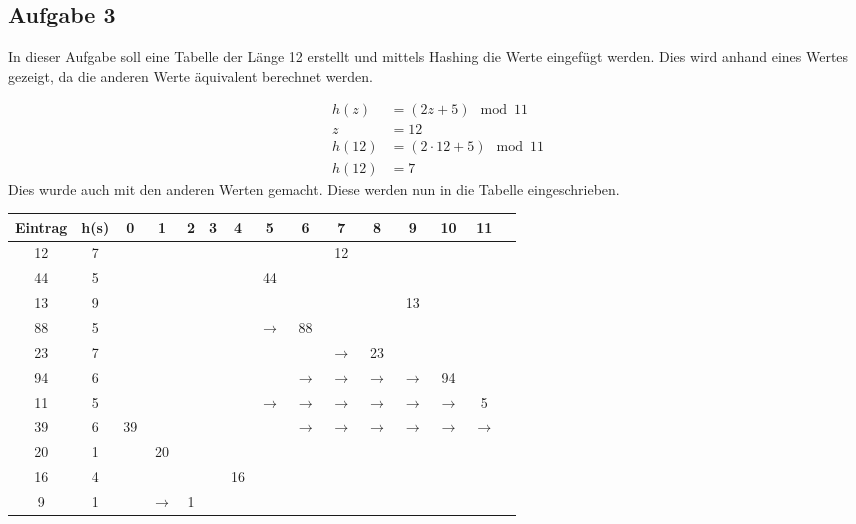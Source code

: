 \documentclass[11pt]{article}
\begin{document}
\newpage

\subsection*{Aufgabe 3}
In dieser Aufgabe soll eine Tabelle der Länge 12 erstellt und mittels Hashing
die Werte eingefügt werden. Dies wird anhand eines Wertes gezeigt, da die 
anderen Werte äquivalent berechnet werden.

\begin{align*}
	h(z) &= (2z+5) \mod 11\\
	z &= 12\\
	h(12) &= (2 \cdot 12 + 5) \mod 11\\
	h(12) &= 7 
\end{align*}
Dies wurde auch mit den anderen Werten gemacht. Diese werden nun in die Tabelle eingeschrieben.
\begin{table}[h!]
	\centering
	\begin{tabular}{|c|c|c|c|c|c|c|c|c|c|c|c|c|c|c|}
		\hline\hline
		\textbf{Eintrag}&\textbf{h(s)} & 0 & 1 & 2 & 3 & 4 & 5 & 6 & 7 & 8 & 9 & 10 & 11 \\
		\hline
		12 & 7 & & & & & & & & 12 & & & &\\
		\hline
		44 & 5 & & & & & & 44 & & & & & &\\
		\hline
		13 & 9 & & & & & & & & & & 13 & &\\
		\hline
		88 & 5 & & & & & & $\rightarrow$ & 88 & & & & &\\
		\hline
		23 & 7 & & & & & & & & $\rightarrow$ & 23 & & &\\
		\hline
		94 & 6 & & & & & & & $\rightarrow$ & $\rightarrow$ & $\rightarrow$ & $\rightarrow$ & 94 &\\
		\hline
		11 & 5 & & & & & & $\rightarrow$ & $\rightarrow$ & $\rightarrow$ & $\rightarrow$ & $\rightarrow$ & $\rightarrow$ & 5 \\
		\hline
		39 & 6 & 39 & & & & & & $\rightarrow$ & $\rightarrow$ & $\rightarrow$ & $\rightarrow$ & $\rightarrow$ & $\rightarrow$ \\
		\hline
		20 & 1 & & 20 & & & & & & & & & &\\
		\hline
		16 & 4 & & & & & 16 & &  & & & & &\\
		\hline
		9 & 1 & & $\rightarrow$ & 1 & & & & & & & & &\\
		\hline
	\end{tabular}
\end{table}
\end{document}
